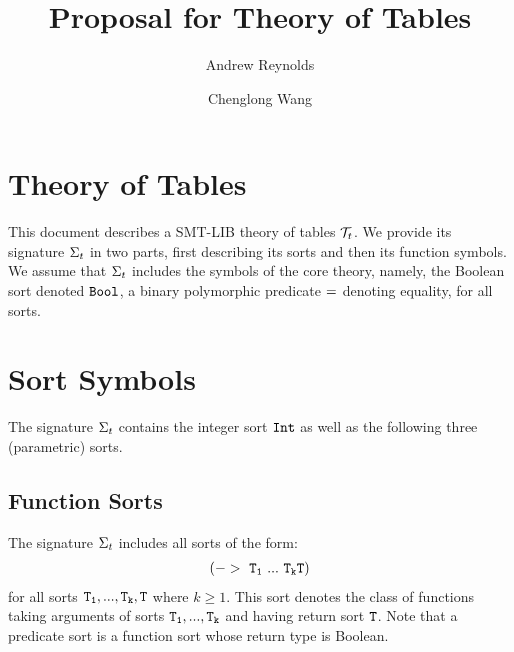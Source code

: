 \documentclass[english,a4paper,10pt]{article}
\begin{document}
\title{Proposal for Theory of Tables}

\author{Andrew Reynolds \and Chenglong Wang}

\maketitle



\section{Theory of Tables}

This document describes a SMT-LIB theory of tables $\mathcal{T}_{t}$.
We provide its signature $\Sigma_{t}$ in two parts,
first describing its sorts and then its function symbols.
We assume that $\Sigma_{t}$ includes the symbols of the core theory, 
namely, the Boolean sort denoted ${\tt Bool}$,
a binary polymorphic predicate ${\tt =}$ denoting equality, for all sorts.

\section{Sort Symbols}

The signature $\Sigma_{t}$ contains 
the integer sort ${\tt Int}$ as well as
the following three (parametric) sorts.

\subsection{Function Sorts}
The signature $\Sigma_{t}$ includes all sorts of the form:
\begin{align*}
{\tt (->\ T_1\ ...\ T_k T)}
\end{align*}
for all sorts ${\tt T_1, ..., T_k, T}$ where $k \geq 1$.
This sort denotes the class of functions taking arguments of sorts ${\tt T_1, ..., T_k}$
and having return sort ${\tt T}$.
Note that a predicate sort is a function sort whose return
type is Boolean.

\begin{comment}
\paragraph{Notes}
\begin{itemize}
\item The term $\syntax{ 
(lambda\ ((x_1\ T_1)\ ...\ (x_n\ T_n))\ t)
}$
has sort 
$\syntax{(->\ T_1\ ...\ T_n\ T)}$
when $\syntax{t}$ has sort $\syntax{T}$.
\end{itemize}
\end{comment}
\end{document}
